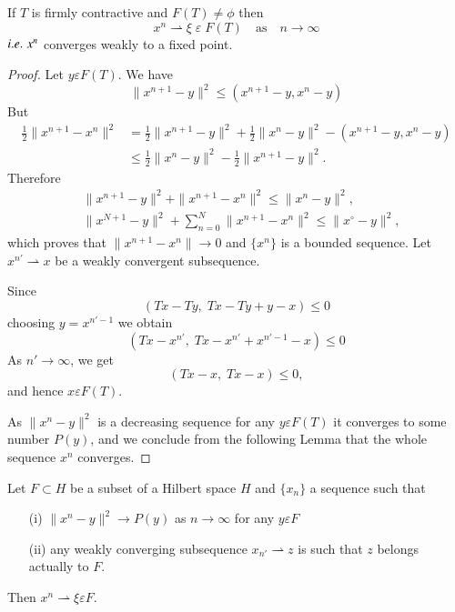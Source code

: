 \begin{THM}\label{chap9:THM4}
If $T$ is firmly contractive and $F(T)\neq\phi$ then 
$$
x^n\rightharpoonup\xi \;\varepsilon \;F(T)\quad\text{as}\quad
n\to\infty
$$
${i.e.}\kern.3em x^n$ converges weakly to a fixed point.
\end{THM}

\begin{proof}
Let $y\varepsilon F(T)$. We have 
$$
\parallel x^{n+1}-y\parallel^2\leq(x^{n+1}-y,x^n-y)
$$
But 
\begin{align*}
\frac{1}{2}\parallel x^{n+1}-x^n\parallel^2 &=\frac{1}{2}\parallel
x^{n+1}-y\parallel^2+\frac{1}{2}\parallel x^n-y\parallel^2-(x^{n+1}
-y, x^n-y)\\
&\leq \frac{1}{2}\parallel x^n-y\parallel^2-\frac{1}{2}\parallel
x^{n+1}-y\parallel^2.
\end{align*}
Therefore
\begin{align*}
&\parallel x^{n+1}-y\parallel^2+\parallel x^{n+1}-x^n\parallel^2 \leq
\parallel x^n-y\parallel^2,\\
&\parallel x^{N+1}-y\parallel^2+\sum\limits_{n=0}^N\parallel x^{n+1}-
x^n\parallel^2 \leq\parallel x^\circ -y\parallel^2,
\end{align*}
which proves that $\parallel x^{n+1}-x^n\parallel\to 0$ and $\{x^n\}$
is a bounded sequence. Let $x^{n'}\rightharpoonup x$ be a weakly
convergent subsequence.

Since\pageoriginale
$$
(Tx-Ty, \;Tx-Ty+y-x)\leq 0
$$
choosing $y=x^{n'-1}$ we obtain 
$$
\left(Tx-x^{n'},\; Tx-x^{n'}+x^{n'-1}-x\right)\leq 0
$$
As $n' \to \infty$, we get
$$
(Tx-x,\;Tx-x)\leq 0,
$$
and hence $x\varepsilon F(T)$. 

As $\parallel x^n-y\parallel^2$ is a decreasing sequence for any
$y\varepsilon F(T)$ it converges to some number $P(y)$, and we
conclude from the following Lemma that the whole sequence $x^n$ converges. 
\end{proof}

\setcounter{opal lem}{4}
\begin{opal lem}\label{chap9:opal lem5}
Let $F\subset H$ be a subset of a Hilbert space $H$ and $\{x_n\}$ a
sequence such that 
\begin{itemize}
\item [
(i)] $\parallel x^n-y\parallel^2\to P(y)$ as $n\to\infty$ for
any $y\varepsilon F$
\item [(ii)] any weakly converging subsequence $x_{n'}\rightharpoonup
  z$ is such that $z$ belongs actually to $F$.
\end{itemize}
Then $x^n\rightharpoonup \xi \varepsilon F$.
\end{opal lem}

